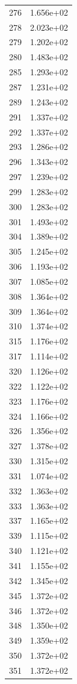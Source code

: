 \documentclass[12pt]{article}
\begin{document}
\begin{longtable}{@{}cc@{}}
276 & 1.656e+02 \\
278 & 2.023e+02 \\
279 & 1.202e+02 \\
280 & 1.483e+02 \\
285 & 1.293e+02 \\
287 & 1.231e+02 \\
289 & 1.243e+02 \\
291 & 1.337e+02 \\
292 & 1.337e+02 \\
293 & 1.286e+02 \\
296 & 1.343e+02 \\
297 & 1.239e+02 \\
299 & 1.283e+02 \\
300 & 1.283e+02 \\
301 & 1.493e+02 \\
304 & 1.389e+02 \\
305 & 1.245e+02 \\
306 & 1.193e+02 \\
307 & 1.085e+02 \\
308 & 1.364e+02 \\
309 & 1.364e+02 \\
310 & 1.374e+02 \\
315 & 1.176e+02 \\
317 & 1.114e+02 \\
320 & 1.126e+02 \\
322 & 1.122e+02 \\
323 & 1.176e+02 \\
324 & 1.166e+02 \\
326 & 1.356e+02 \\
327 & 1.378e+02 \\
330 & 1.315e+02 \\
331 & 1.074e+02 \\
332 & 1.363e+02 \\
333 & 1.363e+02 \\
337 & 1.165e+02 \\
339 & 1.115e+02 \\
340 & 1.121e+02 \\
341 & 1.155e+02 \\
342 & 1.345e+02 \\
345 & 1.372e+02 \\
346 & 1.372e+02 \\
348 & 1.350e+02 \\
349 & 1.359e+02 \\
350 & 1.372e+02 \\
351 & 1.372e+02 \\

\end{longtable}
\end{document}
